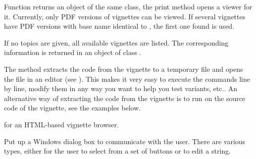 %
\begin{Details}\relax
Function  returns an object of the same class, the
print method opens a viewer for it.
Currently, only PDF versions of vignettes can be viewed.
If several vignettes have PDF versions with base name identical to
, the first one found is used.

If no topics are given, all available vignettes are listed.  The
corresponding information is returned in an object of class
.

The  method
extracts the \R{} code from the vignette to a temporary file and
opens the file in an editor (see ). This makes it
very easy to execute the commands line by line, modify them in any way
you want to help you test variants, etc.. An alternative way of
extracting the \R{} code from the vignette is to run
 on the source code of the vignette,
see the examples below.
\end{Details}
%
\begin{SeeAlso}\relax
{} for an HTML-based vignette browser.
\end{SeeAlso}
%
\begin{Examples}
\end{Examples}
%
\begin{Description}\relax
Put up a Windows dialog box to communicate with the user. There are
various types, either for the user to select from a set of buttons or
to edit a string.
\end{Description}
